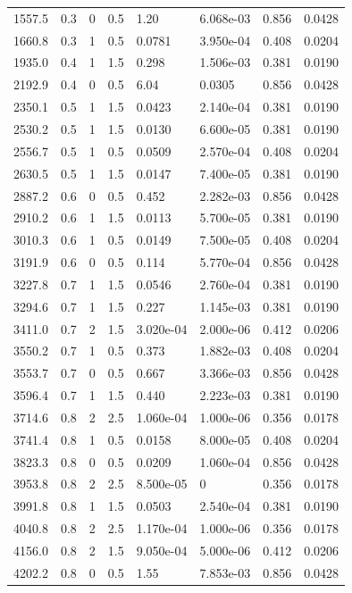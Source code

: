 \documentclass[preview]{standalone}
\begin{document}
{{\begin{tabular}{L{1.2cm}C{1.2cm} C{0.3cm}C{0.5cm} C{1.4cm}C{1.4cm} C{1.4cm}C{1.4cm}}
  1557.5  &   0.3  & 0     & 0.5 &  1.20  & 6.068e-03  & 0.856 &  0.0428   \\ 
  1660.8  &   0.3  & 1     & 0.5 &  0.0781  & 3.950e-04  & 0.408 &  0.0204   \\ 
  1935.0  &   0.4  & 1     & 1.5 &  0.298  & 1.506e-03  & 0.381 &  0.0190   \\ 
  2192.9  &   0.4  & 0     & 0.5 &  6.04  & 0.0305  & 0.856 &  0.0428   \\ 
  2350.1  &   0.5  & 1     & 1.5 &  0.0423  & 2.140e-04  & 0.381 &  0.0190   \\ 
  2530.2  &   0.5  & 1     & 1.5 &  0.0130  & 6.600e-05  & 0.381 &  0.0190   \\ 
  2556.7  &   0.5  & 1     & 0.5 &  0.0509  & 2.570e-04  & 0.408 &  0.0204   \\ 
  2630.5  &   0.5  & 1     & 1.5 &  0.0147  & 7.400e-05  & 0.381 &  0.0190   \\ 
  2887.2  &   0.6  & 0     & 0.5 &  0.452  & 2.282e-03  & 0.856 &  0.0428   \\ 
  2910.2  &   0.6  & 1     & 1.5 &  0.0113  & 5.700e-05  & 0.381 &  0.0190   \\ 
  3010.3  &   0.6  & 1     & 0.5 &  0.0149  & 7.500e-05  & 0.408 &  0.0204   \\ 
  3191.9  &   0.6  & 0     & 0.5 &  0.114  & 5.770e-04  & 0.856 &  0.0428   \\ 
  3227.8  &   0.7  & 1     & 1.5 &  0.0546  & 2.760e-04  & 0.381 &  0.0190   \\ 
  3294.6  &   0.7  & 1     & 1.5 &  0.227  & 1.145e-03  & 0.381 &  0.0190   \\ 
  3411.0  &   0.7  & 2     & 1.5 &  3.020e-04  & 2.000e-06  & 0.412 &  0.0206   \\ 
  3550.2  &   0.7  & 1     & 0.5 &  0.373  & 1.882e-03  & 0.408 &  0.0204   \\ 
  3553.7  &   0.7  & 0     & 0.5 &  0.667  & 3.366e-03  & 0.856 &  0.0428   \\ 
  3596.4  &   0.7  & 1     & 1.5 &  0.440  & 2.223e-03  & 0.381 &  0.0190   \\ 
  3714.6  &   0.8  & 2     & 2.5 &  1.060e-04  & 1.000e-06  & 0.356 &  0.0178   \\ 
  3741.4  &   0.8  & 1     & 0.5 &  0.0158  & 8.000e-05  & 0.408 &  0.0204   \\ 
  3823.3  &   0.8  & 0     & 0.5 &  0.0209  & 1.060e-04  & 0.856 &  0.0428   \\ 
  3953.8  &   0.8  & 2     & 2.5 &  8.500e-05  & 0  & 0.356 &  0.0178   \\ 
  3991.8  &   0.8  & 1     & 1.5 &  0.0503  & 2.540e-04  & 0.381 &  0.0190   \\ 
  4040.8  &   0.8  & 2     & 2.5 &  1.170e-04  & 1.000e-06  & 0.356 &  0.0178   \\ 
  4156.0  &   0.8  & 2     & 1.5 &  9.050e-04  & 5.000e-06  & 0.412 &  0.0206   \\ 
  4202.2  &   0.8  & 0     & 0.5 &  1.55  & 7.853e-03  & 0.856 &  0.0428   \\ 
\hline 
\end{tabular} 

}}
\end{document}
